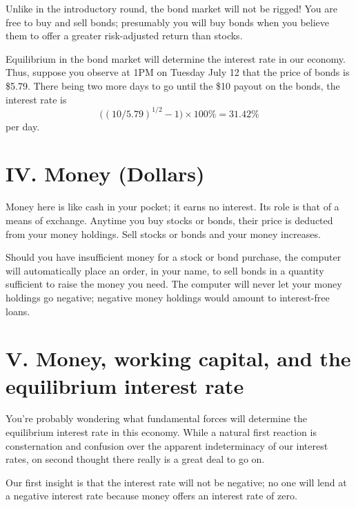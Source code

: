 Unlike in the introductory round, the bond market will not be rigged!
You are free to buy and sell bonds; presumably you will buy bonds when
you believe them to offer a greater risk-adjusted return than stocks.

Equilibrium in the bond market will determine the interest rate in
our economy.  Thus, suppose you observe at 1PM on Tuesday July 12
that the price of bonds is \$5.79.  There being two more days to go
until the \$10 payout on the bonds, the interest rate is 
$$
\big((10/5.79)^{1/2} - 1\big)\times 100\% = 31.42\%
$$
per day.

\section{IV. Money (Dollars)}%
Money here is like cash in your pocket; it earns no interest.  Its
role is that of a means of exchange.  Anytime you buy stocks or
bonds, their price is deducted from your money holdings.  Sell stocks
or bonds and your money increases.%

Should you have insufficient money for a stock or bond purchase, the
computer will automatically place an order, in your name, to sell
bonds in a quantity sufficient to raise the money you need.  The
computer will never let your money holdings go negative; negative
money holdings would amount to interest-free loans. 

\section{V. Money, working capital, and the equilibrium interest rate}%
You're probably wondering what fundamental forces will determine the
equilibrium interest rate in this economy.  While a natural first
reaction is consternation and confusion over the apparent
indeterminacy of our interest rates, on second thought there really is
a great deal to go on.

Our first insight is that the interest rate will not be negative; no
one will lend at a negative interest rate because money offers an
interest rate of zero.

